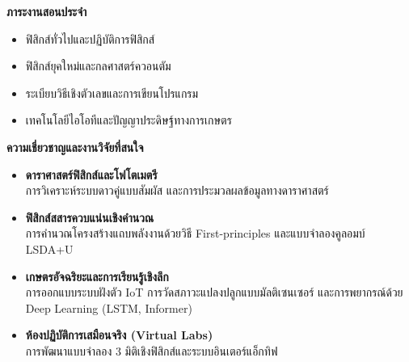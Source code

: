 \begin{tcolorbox}[
    enhanced,
    colback=white,
    colframe=rbruNavy!85!black,
    arc=3mm,
    boxrule=1pt,
    top=8pt, bottom=8pt, left=10pt, right=10pt,
    drop shadow=black!8
]
\begin{minipage}[t]{0.48\textwidth}
        \vspace{6pt}
        {\large\bfseries\color{agriGreen} ภาระงานสอนประจำ}
        \vspace{3pt}
        \begin{itemize}[leftmargin=1.1em, itemsep=1.5pt, topsep=1pt]
            \item ฟิสิกส์ทั่วไปและปฏิบัติการฟิสิกส์
            \item ฟิสิกส์ยุคใหม่และกลศาสตร์ควอนตัม
            \item ระเบียบวิธีเชิงตัวเลขและการเขียนโปรแกรม
            \item เทคโนโลยีไอโอทีและปัญญาประดิษฐ์ทางการเกษตร
        \end{itemize}
    \end{minipage}
    \hfill
    \begin{minipage}[t]{0.48\textwidth}
        {\large\bfseries\color{rbruNavy} ความเชี่ยวชาญและงานวิจัยที่สนใจ}
        \vspace{3pt}
        \begin{itemize}[leftmargin=1.1em, itemsep=1.5pt, topsep=1pt]
            \item \textbf{ดาราศาสตร์ฟิสิกส์และโฟโตเมตรี}\\
            การวิเคราะห์ระบบดาวคู่แบบสัมผัส และการประมวลผลข้อมูลทางดาราศาสตร์
            \item \textbf{ฟิสิกส์สสารควบแน่นเชิงคำนวณ}\\
            การคำนวณโครงสร้างแถบพลังงานด้วยวิธี First-principles และแบบจำลองคูลอมบ์ LSDA+U
            \item \textbf{เกษตรอัจฉริยะและการเรียนรู้เชิงลึก}\\
            การออกแบบระบบฝังตัว IoT การวัดสภาวะแปลงปลูกแบบมัลติเซนเซอร์ และการพยากรณ์ด้วย Deep Learning (LSTM, Informer)
            \item \textbf{ห้องปฏิบัติการเสมือนจริง (Virtual Labs)}\\
            การพัฒนาแบบจำลอง 3 มิติเชิงฟิสิกส์และระบบอินเตอร์แอ็กทิฟ
        \end{itemize}
    \end{minipage}
\end{tcolorbox}
\cleardoublepage
